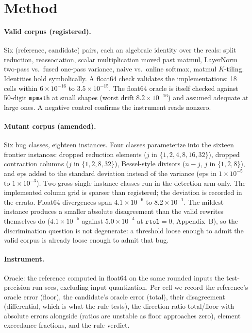 \documentclass[twocolumn,10pt]{article}
\newcommand{\rtol}{\texttt{rtol}}
\newcommand{\e}[2]{$#1\times10^{#2}$}
\begin{document}
\section{Method}

\paragraph{Valid corpus (registered).} Six (reference, candidate) pairs,
each an algebraic identity over the reals: split reduction,
reassociation, scalar multiplication moved past matmul, LayerNorm
two-pass vs.\ fused one-pass variance, naive vs.\ online softmax, matmul
$K$-tiling. Identities hold symbolically. A float64 check validates the
implementations: 18 cells within \e{6}{-16} to \e{3.5}{-15}. The float64
oracle is itself checked against 50-digit \texttt{mpmath} at small shapes
(worst drift \e{8.2}{-16}) and assumed adequate at large ones. A negative
control confirms the instrument reads nonzero.

\paragraph{Mutant corpus (amended).} Six bug classes, eighteen
instances. Four classes parameterize into the sixteen frontier
instances: dropped reduction elements ($j$ in $\{1,2,4,8,16,32\}$),
dropped contraction columns ($j$ in $\{1,2,8,32\}$), Bessel-style
divisors ($n{-}j$, $j$ in $\{1,2,8\}$), and eps added to the standard
deviation instead of the variance (eps in \e{1}{-5} to \e{1}{-3}). Two
gross single-instance classes run in the detection arm only. The
implemented column grid is sparser than registered; the deviation is
recorded in the errata. Float64 divergences span \e{4.1}{-6} to
\e{8.2}{-1}. The mildest instance produces a smaller absolute
disagreement than the valid rewrites themselves do (\e{4.1}{-5} against
\e{5.0}{-4} at $\rtol=0$, Appendix~B), so the discrimination question is
not degenerate: a threshold loose enough to admit the valid corpus is
already loose enough to admit that bug.

\paragraph{Instrument.} Oracle: the reference computed in float64 on the
same rounded inputs the test-precision run sees, excluding input
quantization. Per cell we record the reference's oracle error (floor),
the candidate's oracle error (total), their disagreement (differential,
which is what the rule tests), the direction ratio total/floor with
absolute errors alongside (ratios are unstable as floor approaches
zero), element exceedance fractions, and the rule verdict.
\end{document}
